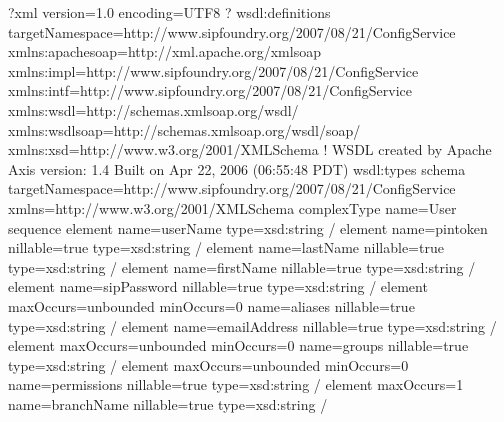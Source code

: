 \documentclass[letterpaper,10pt,english]{sphinxmanual}
\begin{document}
\begin{sphinxVerbatim}[commandchars=\\\{\}]
\PYGZlt{}?xml version=\PYGZdq{}1.0\PYGZdq{} encoding=\PYGZdq{}UTF\PYGZhy{}8\PYGZdq{} ?\PYGZgt{}
\PYGZlt{}wsdl:definitions targetNamespace=\PYGZdq{}http://www.sipfoundry.org/2007/08/21/ConfigService\PYGZdq{} xmlns:apachesoap=\PYGZdq{}http://xml.apache.org/xml\PYGZhy{}soap\PYGZdq{} xmlns:impl=\PYGZdq{}http://www.sipfoundry.org/2007/08/21/ConfigService\PYGZdq{} xmlns:intf=\PYGZdq{}http://www.sipfoundry.org/2007/08/21/ConfigService\PYGZdq{} xmlns:wsdl=\PYGZdq{}http://schemas.xmlsoap.org/wsdl/\PYGZdq{} xmlns:wsdlsoap=\PYGZdq{}http://schemas.xmlsoap.org/wsdl/soap/\PYGZdq{} xmlns:xsd=\PYGZdq{}http://www.w3.org/2001/XMLSchema\PYGZdq{}\PYGZgt{}
\PYGZhy{} \PYGZlt{}!\PYGZhy{}\PYGZhy{}
WSDL created by Apache Axis version: 1.4
Built on Apr 22, 2006 (06:55:48 PDT)
\PYGZhy{}\PYGZhy{}\PYGZgt{}
\PYGZlt{}wsdl:types\PYGZgt{}
\PYGZlt{}schema targetNamespace=\PYGZdq{}http://www.sipfoundry.org/2007/08/21/ConfigService\PYGZdq{} xmlns=\PYGZdq{}http://www.w3.org/2001/XMLSchema\PYGZdq{}\PYGZgt{}
\PYGZlt{}complexType name=\PYGZdq{}User\PYGZdq{}\PYGZgt{}
\PYGZlt{}sequence\PYGZgt{}
\PYGZlt{}element name=\PYGZdq{}userName\PYGZdq{} type=\PYGZdq{}xsd:string\PYGZdq{} /\PYGZgt{}
\PYGZlt{}element name=\PYGZdq{}pintoken\PYGZdq{} nillable=\PYGZdq{}true\PYGZdq{} type=\PYGZdq{}xsd:string\PYGZdq{} /\PYGZgt{}
\PYGZlt{}element name=\PYGZdq{}lastName\PYGZdq{} nillable=\PYGZdq{}true\PYGZdq{} type=\PYGZdq{}xsd:string\PYGZdq{} /\PYGZgt{}
\PYGZlt{}element name=\PYGZdq{}firstName\PYGZdq{} nillable=\PYGZdq{}true\PYGZdq{} type=\PYGZdq{}xsd:string\PYGZdq{} /\PYGZgt{}
\PYGZlt{}element name=\PYGZdq{}sipPassword\PYGZdq{} nillable=\PYGZdq{}true\PYGZdq{} type=\PYGZdq{}xsd:string\PYGZdq{} /\PYGZgt{}
\PYGZlt{}element maxOccurs=\PYGZdq{}unbounded\PYGZdq{} minOccurs=\PYGZdq{}0\PYGZdq{} name=\PYGZdq{}aliases\PYGZdq{} nillable=\PYGZdq{}true\PYGZdq{} type=\PYGZdq{}xsd:string\PYGZdq{} /\PYGZgt{}
\PYGZlt{}element name=\PYGZdq{}emailAddress\PYGZdq{} nillable=\PYGZdq{}true\PYGZdq{} type=\PYGZdq{}xsd:string\PYGZdq{} /\PYGZgt{}
\PYGZlt{}element maxOccurs=\PYGZdq{}unbounded\PYGZdq{} minOccurs=\PYGZdq{}0\PYGZdq{} name=\PYGZdq{}groups\PYGZdq{} nillable=\PYGZdq{}true\PYGZdq{} type=\PYGZdq{}xsd:string\PYGZdq{} /\PYGZgt{}
\PYGZlt{}element maxOccurs=\PYGZdq{}unbounded\PYGZdq{} minOccurs=\PYGZdq{}0\PYGZdq{} name=\PYGZdq{}permissions\PYGZdq{} nillable=\PYGZdq{}true\PYGZdq{} type=\PYGZdq{}xsd:string\PYGZdq{} /\PYGZgt{}
\PYGZlt{}element maxOccurs=\PYGZdq{}1\PYGZdq{} name=\PYGZdq{}branchName\PYGZdq{} nillable=\PYGZdq{}true\PYGZdq{} type=\PYGZdq{}xsd:string\PYGZdq{} /\PYGZgt{}

\end{sphinxVerbatim}
\end{document}
